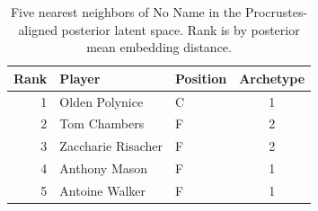 \begin{table}[htbp]
  \centering\small
  \begin{tabular}{rllc}
    \toprule
    Rank & Player & Position & Archetype \\
    \midrule
    1 & Olden Polynice & C & 1 \\
    2 & Tom Chambers & F & 2 \\
    3 & Zaccharie Risacher & F & 2 \\
    4 & Anthony Mason & F & 1 \\
    5 & Antoine Walker & F & 1 \\
    \bottomrule
  \end{tabular}
  \caption{Five nearest neighbors of No Name in the Procrustes-aligned posterior latent space. Rank is by posterior mean embedding distance.}
  \label{tab:No_Name_neighbors}
\end{table}

